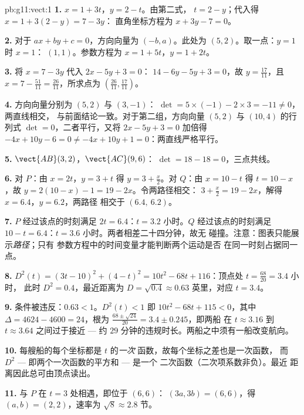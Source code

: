 \begin{solution}{pb:g11:vect:1}
\textbf{1.} $x = 1 + 3t$，$y = 2 - t$。由第二式，
$t = 2 - y$；代入得 $x = 1 + 3(2 - y) = 7 - 3y$：
直角坐标方程为 $x + 3y - 7 = 0$。

\textbf{2.} 对于 $ax + by + c = 0$，方向向量为
$(-b, a)$。此处为 $(5, 2)$。取一点：$y = 1$ 时 $x = 1$：
$(1, 1)$。参数方程为 $x = 1 + 5t$，$y = 1 + 2t$。

\textbf{3.} 将 $x = 7 - 3y$ 代入 $2x - 5y + 3 = 0$：
$14 - 6y - 5y + 3 = 0$，故 $y = \frac{17}{11}$，且
$x = 7 - \frac{51}{11} = \frac{26}{11}$，所求点为
$\left(\frac{26}{11}, \frac{17}{11}\right)$。

\textbf{4.} 方向向量分别为 $(5, 2)$ 与 $(3, -1)$：
$\det = 5 \times (-1) - 2 \times 3 = -11 \neq 0$，两直线相交，
与前面结论一致。对于第二组，方向向量 $(5, 2)$ 与
$(10, 4)$ 的行列式 $\det = 0$，二者平行，又将
$2x - 5y + 3 = 0$ 加倍得 $-4x + 10y - 6 = 0 \neq -4x + 10y + 1
= 0$：两直线严格平行。

\textbf{5.} $\vect{AB}(3, 2)$，$\vect{AC}(9, 6)$：
$\det = 18 - 18 = 0$，三点共线。

\textbf{6.} 对 $P$：由 $x = 2t$，$y = 3 + t$ 得 $y = 3 +
\frac x2$。对 $Q$：由 $x = 10 - t$ 得 $t = 10 - x$，故
$y = 2(10 - x) - 1 = 19 - 2x$。令两路径相交：
$3 + \frac x2 = 19 - 2x$，解得 $x = 6.4$，$y = 6.2$，两路径
相交于 $(6.4,\ 6.2)$。

\textbf{7.} $P$ 经过该点的时刻满足 $2t = 6.4$：$t = 3.2$ 小时。$Q$
经过该点的时刻满足 $10 - t = 6.4$：$t = 3.6$ 小时。两者相差二十四分钟，故无
碰撞。注意：图表只能展示\emph{路径}；只有
参数方程中的时间变量才能判断两个运动是否
在同一时刻占据同一点。

\textbf{8.} $D^2(t) = (3t - 10)^2 + (4 - t)^2 =
10t^2 - 68t + 116$：顶点处 $t = \frac{68}{20} = 3.4$ 小时，
此时 $D^2 = 0.4$，最近距离为
$D = \sqrt{0.4} \approx 0.63$ 英里，对应 $t = 3.4$。

\textbf{9.} 条件被违反：$0.63 < 1$。$D^2(t) < 1$ 即
$10t^2 - 68t + 115 < 0$，其中 $\Delta = 4624 - 4600 = 24$，根为
$\frac{68 \pm \sqrt{24}}{20} = 3.4 \pm 0.245$，即两船
在 $t \approx 3.16$ 到 $t \approx 3.64$ 之间过于接近 --- 约
$29$ 分钟的违规时长。两船之中须有一船改变航向。

\textbf{10.} 每艘船的每个坐标都是 $t$ 的\emph{一次}
函数，故每个坐标之差也是一次函数，
而 $D^2$ --- 即两个一次函数的平方和 --- 是一个
二次函数（二次项系数非负）。最近
距离因此总可由顶点读出。

\textbf{11.} 与 $P$ 在 $t = 3$ 处相遇，即位于 $(6, 6)$：
$(3a, 3b) = (6, 6)$，得 $(a, b) = (2, 2)$，速率为
$\sqrt{8} \approx 2.8$ 节。


\end{solution}
